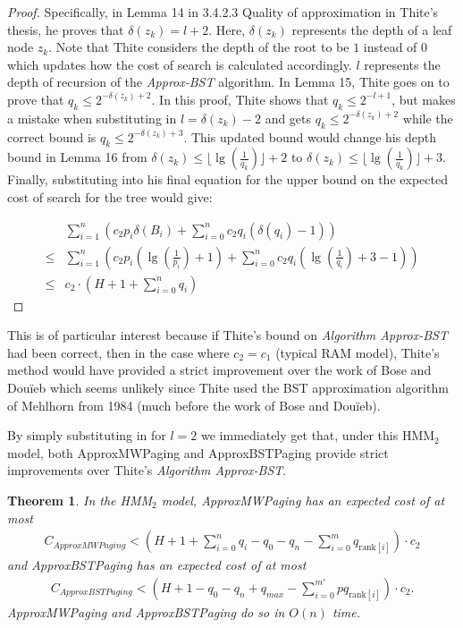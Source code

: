 \documentclass[letterpaper,12pt,titlepage,oneside,final]{book}
\theoremstyle{plain}
\newtheorem{thm}{Theorem}[section]
\begin{document}
\begin{proof}
Specifically, in Lemma 14 in 3.4.2.3 Quality of approximation in Thite's thesis, he proves that $\delta(z_k) = l+2$. Here, $\delta(z_k)$ represents the depth of a leaf node $z_k$. Note that Thite considers the depth of the root to be $1$ instead of $0$ which updates how the cost of search is calculated accordingly. $l$ represents the depth of recursion of the \textit{Approx-BST} algorithm. In Lemma 15, Thite goes on to prove that $q_k \leq 2^{-\delta(z_k)+2}$. In this proof, Thite shows that $q_k \leq 2^{-l+1}$, but makes a mistake when substituting in $l=\delta(z_k)-2$ and gets $q_k \leq 2^{-\delta(z_k)+2}$ while the correct bound is $q_k \leq 2^{-\delta(z_k)+3}$. This updated bound would change his depth bound in Lemma 16 from $\delta(z_k) \leq \lfloor \lg(\frac{1}{q_k}) \rfloor + 2$ to $\delta(z_k) \leq \lfloor \lg(\frac{1}{q_k}) \rfloor + 3$. Finally, substituting into his final equation for the upper bound on the expected cost of search for the tree would give:

\begin{align*}
&\sum_{i=1}^{n} \left(c_2 p_i \delta(B_i )+ \sum_{i=0}^{n} c_2 q_i (\delta(q_i)-1) \right)\\
\leq &\sum_{i=1}^{n} \left(c_2 p_i (\lg(\frac{1}{p_i})+1)+ \sum_{i=0}^{n} c_2 q_i (\lg(\frac{1}{q_i})+3-1) \right) \\
\leq &c_2 \cdot \left(H+1+\sum_{i=0}^{n}q_i \right)
\end{align*}
\end{proof}

This is of particular interest because if Thite's bound on \textit{Algorithm Approx-BST} had been correct, then in the case where $c_2=c_1$ (typical RAM model), Thite's method would have provided a strict improvement over the work of Bose and Dou\"{i}eb \cite{bose2009efficient} which seems unlikely since Thite used the BST approximation algorithm of Mehlhorn from 1984 \cite{mehlhorn1984sorting} (much before the work of Bose and Dou\"{i}eb).

By simply substituting in for $l=2$ we immediately get that, under this HMM$_2$ model, both ApproxMWPaging and ApproxBSTPaging provide strict improvements over Thite's \textit{Algorithm Approx-BST}. 

\begin{thm}
In the HMM$_2$ model, ApproxMWPaging has an expected cost of at most \\
\begin{align*}
C_{ApproxMWPaging} < (H + 1 + \sum_{i=0}^n q_i - q_0 - q_n - \sum_{i=0}^m q_{\text{rank}[i]}) \cdot  c_2
\end{align*}
and ApproxBSTPaging has an expected cost of at most
\begin{align*}
C_{ApproxBSTPaging} <  (H + 1 - q_0 - q_n + q_{max} - \sum_{i=0}^{m'} pq_{\text{rank}[i]})\cdot c_2.
\end{align*}
ApproxMWPaging and ApproxBSTPaging do so in $O(n)$ time.
\end{thm}
\end{document}
